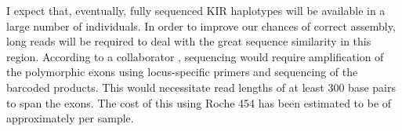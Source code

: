 I expect that, eventually, fully sequenced KIR haplotypes will be available in a large number of individuals.
In order to improve our chances of correct assembly, long reads will be required to deal with the great sequence similarity in this region.
According to a collaborator , sequencing would require amplification of the polymorphic exons using locus-specific primers and sequencing of the barcoded products.
This would necessitate read lengths of at least 300 base pairs to span the exons.
The cost of this using Roche 454 has been estimated to be of approximately  per sample.


